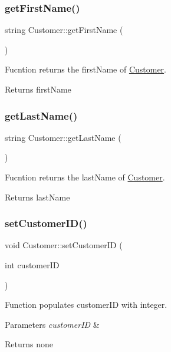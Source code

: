 \subsubsection{\texorpdfstring{get\+First\+Name()}{getFirstName()}}
{\footnotesize\ttfamily string Customer\+::get\+First\+Name (\begin{DoxyParamCaption}{ }\end{DoxyParamCaption})}

Fucntion returns the first\+Name of \hyperlink{class_customer}{Customer}. \begin{DoxyReturn}{Returns}
first\+Name 
\end{DoxyReturn}
\mbox{\label{class_customer_aef91fec461e6d0ad72ef3162b8711b76}} 
\subsubsection{\texorpdfstring{get\+Last\+Name()}{getLastName()}}
{\footnotesize\ttfamily string Customer\+::get\+Last\+Name (\begin{DoxyParamCaption}{ }\end{DoxyParamCaption})}

Fucntion returns the last\+Name of \hyperlink{class_customer}{Customer}. \begin{DoxyReturn}{Returns}
last\+Name 
\end{DoxyReturn}
\mbox{\label{class_customer_af17373c7df70e19949f35274bef0071e}} 
\subsubsection{\texorpdfstring{set\+Customer\+I\+D()}{setCustomerID()}}
{\footnotesize\ttfamily void Customer\+::set\+Customer\+ID (\begin{DoxyParamCaption}\item[{int}]{customer\+ID }\end{DoxyParamCaption})}

Function populates customer\+ID with integer. 
\begin{DoxyParams}{Parameters}
{\em customer\+ID} & \\
\hline
\end{DoxyParams}
\begin{DoxyReturn}{Returns}
none 
\end{DoxyReturn}
\mbox{\label{class_customer_aad7bbf65329d9ad4bc4a99cb5ed8fdbd}} 
